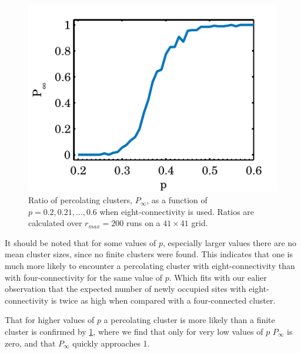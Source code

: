 \begin{figure}%
	\centering
	\includegraphics[width=\columnwidth]{./img/assignment_d_p_infinite_ratio_p.pdf}
	\caption{Ratio of percolating clusters, $P_\infty$, as a function of $p = 0.2, 0.21, \dotsc, 0.6$ when eight-connectivity is used. Ratios are calculated over $r_{max} = 200$ runs on a $41 \times 41$ grid.}
	\label{fig:experiment:conn:p_inf_ratio}
\end{figure}


It should be noted that for some values of $p$, especially larger values there are no mean cluster sizes, since no finite clusters were found. This indicates that one is much more likely to encounter a percolating cluster with eight-connectivity than with four-connectivity for the same value of $p$. Which fits with our ealier observation that the expected number of newly occupied sites with eight-connectivity is twice as high when compared with a four-connected cluster.

That for higher values of $p$ a percolating cluster is more likely than a finite cluster is confirmed by \cref{fig:experiment:conn:p_inf_ratio}, where we find that only for very low values of $p$ $P_\infty$ is zero, and that $P_\infty$ quickly approaches 1. 

